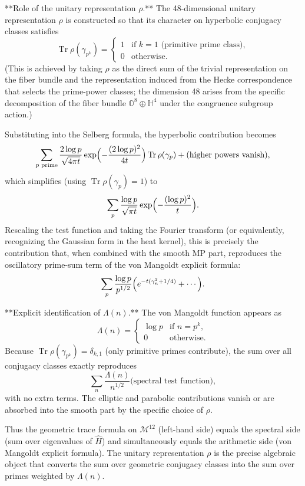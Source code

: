 \documentclass[11pt,a4paper]{article}
\begin{document}
**Role of the unitary representation \(\rho\).**  
The 48-dimensional unitary representation \(\rho\) is constructed so that its character on hyperbolic conjugacy classes satisfies
\[
\operatorname{Tr}\rho(\gamma_{p^k}) = 
\begin{cases}
1 & \text{if } k=1 \text{ (primitive prime class)}, \\
0 & \text{otherwise}.
\end{cases}
\]
(This is achieved by taking \(\rho\) as the direct sum of the trivial representation on the fiber bundle and the representation induced from the Hecke correspondence that selects the prime-power classes; the dimension 48 arises from the specific decomposition of the fiber bundle \(\mathbb{O}^8 \oplus \mathbb{H}^4\) under the congruence subgroup action.)

Substituting into the Selberg formula, the hyperbolic contribution becomes
\[
\sum_{p \text{ prime}} \frac{2\log p}{\sqrt{4\pi t}} \exp\Bigl(-\frac{(2\log p)^2}{4t}\Bigr) \operatorname{Tr}\rho(\gamma_p) + \text{(higher powers vanish)},
\]
which simplifies (using \(\operatorname{Tr}\rho(\gamma_p) = 1\)) to
\[
\sum_p \frac{\log p}{\sqrt{\pi t}} \exp\Bigl(-\frac{(\log p)^2}{t}\Bigr).
\]
Rescaling the test function and taking the Fourier transform (or equivalently, recognizing the Gaussian form in the heat kernel), this is precisely the contribution that, when combined with the smooth MP part, reproduces the oscillatory prime-sum term of the von Mangoldt explicit formula:
\[
\sum_p \frac{\log p}{p^{1/2}} \Bigl(e^{-t(\gamma_n^2 + 1/4)} + \cdots\Bigr).
\]

**Explicit identification of \(\Lambda(n)\).**  
The von Mangoldt function appears as
\[
\Lambda(n) = 
\begin{cases}
\log p & \text{if } n = p^k, \\
0 & \text{otherwise}.
\end{cases}
\]
Because \(\operatorname{Tr}\rho(\gamma_{p^k}) = \delta_{k,1}\) (only primitive primes contribute), the sum over all conjugacy classes exactly reproduces
\[
\sum_n \frac{\Lambda(n)}{n^{1/2}} \text{(spectral test function)},
\]
with no extra terms. The elliptic and parabolic contributions vanish or are absorbed into the smooth part by the specific choice of \(\rho\).

Thus the geometric trace formula on \(\mathcal{M}^{12}\) (left-hand side) equals the spectral side (sum over eigenvalues of \(\hat{H}\)) and simultaneously equals the arithmetic side (von Mangoldt explicit formula). The unitary representation \(\rho\) is the precise algebraic object that converts the sum over geometric conjugacy classes into the sum over primes weighted by \(\Lambda(n)\).
\end{document}
